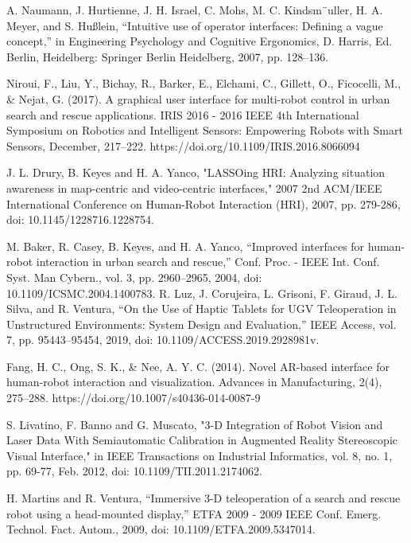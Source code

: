 \documentclass[conference]{IEEEtran}
\begin{document}
\begin{thebibliography}{00}
A. Naumann, J. Hurtienne, J. H. Israel, C. Mohs, M. C. Kindsm¨uller, H. A. Meyer, and S. Hußlein, “Intuitive use of operator interfaces: Defining a vague concept,” in Engineering Psychology and Cognitive Ergonomics, D. Harris, Ed. Berlin, Heidelberg: Springer Berlin Heidelberg, 2007, pp. 128–136.

Niroui, F., Liu, Y., Bichay, R., Barker, E., Elchami, C., Gillett, O., Ficocelli, M., & Nejat, G. (2017). A graphical user interface for multi-robot control in urban search and rescue applications. IRIS 2016 - 2016 IEEE 4th International Symposium on Robotics and Intelligent Sensors: Empowering Robots with Smart Sensors, December, 217–222. https://doi.org/10.1109/IRIS.2016.8066094

J. L. Drury, B. Keyes and H. A. Yanco, "LASSOing HRI: Analyzing situation awareness in map-centric and video-centric interfaces," 2007 2nd ACM/IEEE International Conference on Human-Robot Interaction (HRI), 2007, pp. 279-286, doi: 10.1145/1228716.1228754.













 M. Baker, R. Casey, B. Keyes, and H. A. Yanco, “Improved interfaces for human-robot interaction in urban search and rescue,” Conf. Proc. - IEEE Int. Conf. Syst. Man Cybern., vol. 3, pp. 2960–2965, 2004, doi: 10.1109/ICSMC.2004.1400783.
R. Luz, J. Corujeira, L. Grisoni, F. Giraud, J. L. Silva, and R. Ventura, “On the Use of Haptic Tablets for UGV Teleoperation in Unstructured Environments: System Design and Evaluation,” IEEE Access, vol. 7, pp. 95443–95454, 2019, doi: 10.1109/ACCESS.2019.2928981v.

Fang, H. C., Ong, S. K., & Nee, A. Y. C. (2014). Novel AR-based interface for human-robot interaction and visualization. Advances in Manufacturing, 2(4), 275–288. https://doi.org/10.1007/s40436-014-0087-9


S. Livatino, F. Banno and G. Muscato, "3-D Integration of Robot Vision and Laser Data With Semiautomatic Calibration in Augmented Reality Stereoscopic Visual Interface," in IEEE Transactions on Industrial Informatics, vol. 8, no. 1, pp. 69-77, Feb. 2012, doi: 10.1109/TII.2011.2174062.

H. Martins and R. Ventura, “Immersive 3-D teleoperation of a search and rescue robot using a head-mounted display,” ETFA 2009 - 2009 IEEE Conf. Emerg. Technol. Fact. Autom., 2009, doi: 10.1109/ETFA.2009.5347014.


\end{thebibliography}
\end{document}
